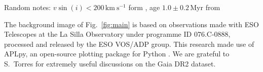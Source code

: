 \documentclass{aa}
\DeclareRobustCommand{\Figref}[1]{Fig.~\ref{#1}}
\begin{document}
Random notes: $v\sin(i)<200\,\mathrm{km\ s^{-1}}$ form \cite{schneider:18}, age $1.0\pm 0.2$\,Myr
from \cite{schneider:18}




\begin{acknowledgements}
  The background image of \Figref{fig:main} is based on observations
  made with ESO Telescopes at the La Silla Observatory under programme
  ID 076.C-0888, processed and released by the ESO VOS/ADP group.
  This research made use of APLpy, an open-source plotting package for Python \cite{robitaille:12}.
  We are grateful to S.~Torres for extremely useful discussions on the
  Gaia DR2 dataset.
\end{acknowledgements}
\end{document}
